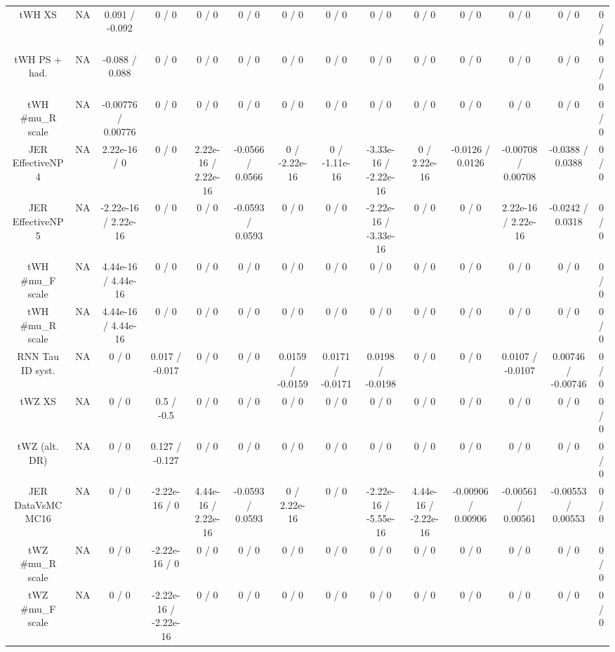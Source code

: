 \documentclass[10pt]{article}
\begin{document}
\begin{table}[htbp]
\begin{center}
\begin{tabular}{|c|c|c|c|c|c|c|c|c|c|c|c|c|c|}
  tWH XS &    NA    & 0.091 / -0.092 & 0 / 0 & 0 / 0 & 0 / 0 & 0 / 0 & 0 / 0 & 0 / 0 & 0 / 0 & 0 / 0 & 0 / 0 & 0 / 0 & 0 / 0 \\ 
  tWH PS + had. &    NA    & -0.088 / 0.088 & 0 / 0 & 0 / 0 & 0 / 0 & 0 / 0 & 0 / 0 & 0 / 0 & 0 / 0 & 0 / 0 & 0 / 0 & 0 / 0 & 0 / 0 \\ 
  tWH #mu_{R} scale &    NA    & -0.00776 / 0.00776 & 0 / 0 & 0 / 0 & 0 / 0 & 0 / 0 & 0 / 0 & 0 / 0 & 0 / 0 & 0 / 0 & 0 / 0 & 0 / 0 & 0 / 0 \\ 
  JER EffectiveNP 4 &    NA    & 2.22e-16 / 0 & 0 / 0 & 2.22e-16 / 2.22e-16 & -0.0566 / 0.0566 & 0 / -2.22e-16 & 0 / -1.11e-16 & -3.33e-16 / -2.22e-16 & 0 / 2.22e-16 & -0.0126 / 0.0126 & -0.00708 / 0.00708 & -0.0388 / 0.0388 & 0 / 0 \\ 
  JER EffectiveNP 5 &    NA    & -2.22e-16 / 2.22e-16 & 0 / 0 & 0 / 0 & -0.0593 / 0.0593 & 0 / 0 & 0 / 0 & -2.22e-16 / -3.33e-16 & 0 / 0 & 0 / 0 & 2.22e-16 / 2.22e-16 & -0.0242 / 0.0318 & 0 / 0 \\ 
  tWH #mu_{F} scale &    NA    & 4.44e-16 / 4.44e-16 & 0 / 0 & 0 / 0 & 0 / 0 & 0 / 0 & 0 / 0 & 0 / 0 & 0 / 0 & 0 / 0 & 0 / 0 & 0 / 0 & 0 / 0 \\ 
  tWH #mu_{R} scale &    NA    & 4.44e-16 / 4.44e-16 & 0 / 0 & 0 / 0 & 0 / 0 & 0 / 0 & 0 / 0 & 0 / 0 & 0 / 0 & 0 / 0 & 0 / 0 & 0 / 0 & 0 / 0 \\ 
  RNN Tau ID syst. &    NA    & 0 / 0 & 0.017 / -0.017 & 0 / 0 & 0 / 0 & 0.0159 / -0.0159 & 0.0171 / -0.0171 & 0.0198 / -0.0198 & 0 / 0 & 0 / 0 & 0.0107 / -0.0107 & 0.00746 / -0.00746 & 0 / 0 \\ 
  tWZ XS &    NA    & 0 / 0 & 0.5 / -0.5 & 0 / 0 & 0 / 0 & 0 / 0 & 0 / 0 & 0 / 0 & 0 / 0 & 0 / 0 & 0 / 0 & 0 / 0 & 0 / 0 \\ 
  tWZ (alt. DR) &    NA    & 0 / 0 & 0.127 / -0.127 & 0 / 0 & 0 / 0 & 0 / 0 & 0 / 0 & 0 / 0 & 0 / 0 & 0 / 0 & 0 / 0 & 0 / 0 & 0 / 0 \\ 
  JER DataVsMC MC16 &    NA    & 0 / 0 & -2.22e-16 / 0 & 4.44e-16 / 2.22e-16 & -0.0593 / 0.0593 & 0 / 2.22e-16 & 0 / 0 & -2.22e-16 / -5.55e-16 & 4.44e-16 / -2.22e-16 & -0.00906 / 0.00906 & -0.00561 / 0.00561 & -0.00553 / 0.00553 & 0 / 0 \\ 
  tWZ #mu_{R} scale &    NA    & 0 / 0 & -2.22e-16 / 0 & 0 / 0 & 0 / 0 & 0 / 0 & 0 / 0 & 0 / 0 & 0 / 0 & 0 / 0 & 0 / 0 & 0 / 0 & 0 / 0 \\ 
  tWZ #mu_{F} scale &    NA    & 0 / 0 & -2.22e-16 / -2.22e-16 & 0 / 0 & 0 / 0 & 0 / 0 & 0 / 0 & 0 / 0 & 0 / 0 & 0 / 0 & 0 / 0 & 0 / 0 & 0 / 0 \\ 

\end{tabular}
\end{center}
\end{table}
\end{document}
